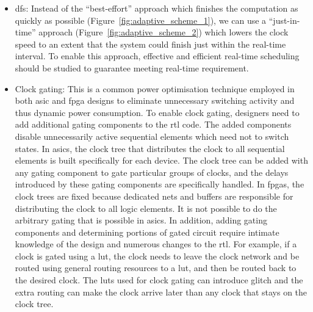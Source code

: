 \begin{itemize}
\item \gls{dfs}: Instead of the ``best-effort'' approach which finishes the computation as quickly as possible (Figure~\ref{fig:adaptive_scheme_1}), we can use a ``just-in-time'' approach (Figure~\ref{fig:adaptive_scheme_2}) which lowers the clock speed to an extent that the system could finish just within the real-time interval.
To enable this approach, effective and efficient real-time scheduling should be studied to guarantee meeting real-time requirement.
\item Clock gating: This is a common power optimisation technique employed in both \gls{asic} and \gls{fpga} designs to eliminate unnecessary switching activity and thus dynamic power consumption.
To enable clock gating, designers need to add additional gating components to the \gls{rtl} code.
The added components disable unnecessarily active sequential elements which need not to switch states.
In \glspl{asic}, the clock tree that distributes the clock to all sequential elements is built specifically for each device.
The clock tree can be added with any gating component to gate particular groups of clocks, and the delays introduced by these gating components are specifically handled.
In \glspl{fpga}, the clock trees are fixed because dedicated nets and buffers are responsible for distributing the clock to all logic elements.
It is not possible to do the arbitrary gating that is possible in \glspl{asic}.
In addition, adding gating components and determining portions of gated circuit require intimate knowledge of the design and numerous changes to the \gls{rtl}.
For example, if a clock is gated using a \gls{lut}, the clock needs to leave the clock network and be routed using general routing resources to a \gls{lut}, and then be routed back to the desired clock. 
The \glspl{lut} used for clock gating can introduce glitch and the extra routing can make the clock arrive later than any clock that stays on the clock tree.
\end{itemize}

